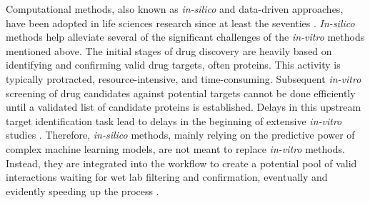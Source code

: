 \documentclass[utf8]{FrontiersinHarvard}
\begin{document}
	Computational methods, also known as \textit{in-silico} and data-driven approaches, have been adopted in life sciences research since at least the seventies \cite{wodak_computeranalysisproteinprotein_1978}. \textit{In-silico} methods help alleviate several of the significant challenges of the \textit{in-vitro} methods mentioned above. The initial stages of drug discovery are heavily based on identifying and confirming valid drug targets, often proteins. This activity is typically protracted, resource-intensive, and time-consuming. Subsequent \textit{in-vitro} screening of drug candidates against potential targets cannot be done efficiently until a validated list of candidate proteins is established. Delays in this upstream target identification task lead to delays in the beginning of extensive \textit{in-vitro} studies \cite{scannell_diagnosingdeclinepharmaceutical_2012}. Therefore, \textit{in-silico} methods, mainly relying on the predictive power of complex machine learning models, are not meant to replace \textit{in-vitro} methods. Instead, they are integrated into the workflow to create a potential pool of valid interactions waiting for wet lab filtering and confirmation, eventually and evidently speeding up the process \cite{vidal_interactomenetworkshuman_2011}.
	
\end{document}
